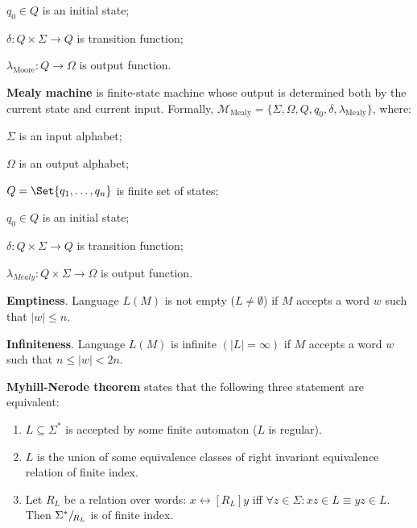 \documentclass[a4paper,10pt]{article}
\begin{document}
\begin{terms}
\begin{terms}
        \item $q_0 \in Q$ is an initial state;

        \item $\delta \colon Q \times \Sigma \to Q$ is transition function;

        \item $\lambda_\text{Moore} \colon Q \to \Omega$ is output function.
    \end{terms}

    \item \textbf{Mealy machine} is finite-state machine whose output is determined both by the current state and current input.
    Formally, $\mathcal{M}_\text{Mealy} = \{\Sigma, \Omega, Q, q_0, \delta, \lambda_\text{Mealy}\}$, where:

    \begin{terms}
        \item $\Sigma$ is an input alphabet;

        \item $\Omega$ is an output alphabet;

        \item $Q = \Set{q_1, \dots, q_n}$ is finite set of states;

        \item $q_0 \in Q$ is an initial state;

        \item $\delta \colon Q \times \Sigma \to Q$ is transition function;

        \item $\lambda_{Mealy} \colon Q \times \Sigma \to \Omega$ is output function.
    \end{terms}

    \item \textbf{Emptiness}. Language $L(M)$ is not empty ($L \neq \emptyset$) if $M$ accepts a word $w$ such that $|w| \leq n$.

    \item \textbf{Infiniteness}. Language $L(M)$ is infinite $(|L| = \infty)$ if $M$ accepts a word $w$ such that $n \leq |w| < 2n$.

    \item \textbf{Myhill-Nerode theorem} states that the following three statement are equivalent:
    \begin{enumerate}
        \item $L \subseteq \Sigma^*$ is accepted by some finite automaton ($L$ is regular).

        \item $L$ is the union of some equivalence classes of right invariant equivalence relation of finite index.

        \item Let $R_L$ be a relation over words: $x \rel[R_L] y$ iff $\forall z \in \Sigma : xz \in L \equiv yz \in L$.
        Then $\quotient[R_L]{\Sigma^*}$ is of finite index.
    \end{enumerate}

\end{terms}
\end{document}
